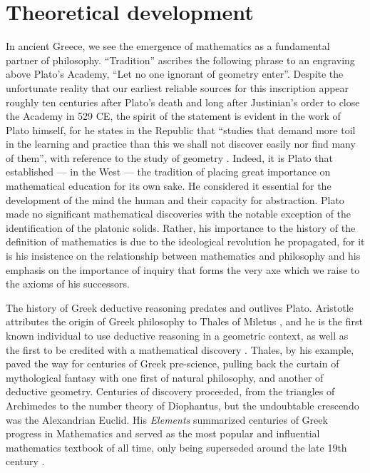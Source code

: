 \documentclass[12pt]{article}
\begin{document}

\section{Theoretical development}

In ancient Greece,
we see the emergence of mathematics
as a fundamental partner of philosophy.
``Tradition'' ascribes the following phrase
to an engraving above Plato's Academy,
``Let no one ignorant of geometry enter''.
Despite the unfortunate reality that
our earliest reliable sources for this inscription
appear roughly ten centuries after Plato's death \cite{plato_truth}
and long after Justinian's order to close
the Academy in 529 CE, 
the spirit of the statement is evident
in the work of Plato himself,
for he states in the Republic that
``studies that demand more toil
in the learning and practice than this
we shall not discover easily
nor find many of them'',
with reference to
the study of geometry \cite{plato}.
Indeed, it is Plato that established ---
in the West ---
the tradition of placing great importance
on mathematical education
for its own sake.
He considered it essential
for the development
of the mind the human
and their capacity for abstraction.
Plato made no significant mathematical discoveries
with the notable exception of the identification
of the platonic solids.
Rather, his importance to
the history of the definition of mathematics
is due to the ideological revolution he propagated,
for it is his insistence on the relationship between
mathematics and philosophy
and his emphasis on the importance of inquiry
that forms the very axe which we raise
to the axioms of his successors.

The history of
Greek deductive reasoning
predates and outlives Plato.
Aristotle attributes
the origin of
Greek philosophy
to Thales of Miletus \cite{aristotle_thales},
and he is the first known
individual to use
deductive reasoning in a geometric context,
as well as the first to be credited
with a mathematical discovery \cite{boyer1991}.
Thales, by his example,
paved the way for centuries of Greek pre-science,
pulling back the curtain of mythological fantasy
with one first of natural philosophy,
and another of deductive geometry.
Centuries of discovery proceeded,
from the triangles of Archimedes
to the number theory of Diophantus,
but the undoubtable crescendo
was the Alexandrian Euclid.
His \textit{Elements} summarized
centuries of Greek progress in Mathematics
and served as the most popular
and influential mathematics textbook of all time,
only being superseded around the late 19th century \cite{boyer1991}.
\end{document}
